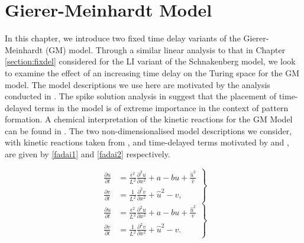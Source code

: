 \chapter{Gierer-Meinhardt Model}

In this chapter, we introduce two fixed time delay variants of the Gierer-Meinhardt (GM) model. Through a similar linear analysis to that in Chapter \ref{section:fixdel} considered for the LI variant of the Schnakenberg model, we look to examine the effect of an increasing time delay on the Turing space for the GM model. The model descriptions we use here are motivated by the analysis conducted in \cite{fadai1,fadai2}. The spike solution analysis in \cite{fadai1,fadai2} suggest that the placement of time-delayed terms in the model is of extreme importance in the context of pattern formation. A chemical interpretation of the kinetic reactions for the GM Model can be found in \cite{leegaffmonk}. The two non-dimensionalised model descriptions we consider, with kinetic reactions taken from \cite{murray}, and time-delayed terms motivated by \cite{fadai1} and \cite{fadai2}, are given by \eqref{fadai1} and \eqref{fadai2} respectively.
\begin{multicols}{2}
\begin{equation}\label{fadai1}
  \left.\begin{split}
\frac{\partial u}{\partial t}&=\frac{\epsilon^2}{L^2}\frac{\partial^2 u}{\partial x^2}+a-bu+\frac{\hat{u}^2}{\hat{v}}\\
\frac{\partial v}{\partial t}&=\frac{1}{L^2}\frac{\partial^2 v}{\partial x^2}+\hat{u}^2-v,
\end{split}\right\}
\end{equation}
\break
\begin{equation}\label{fadai2}
  \left.\begin{split}
\frac{\partial u}{\partial t}&=\frac{\epsilon^2}{L^2}\frac{\partial^2 u}{\partial x^2}+a-bu+\frac{\hat{u}^2}{v}\\
\frac{\partial v}{\partial t}&=\frac{1}{L^2}\frac{\partial^2 v}{\partial x^2}+\hat{u}^2-v.
\end{split}\right\}
\end{equation}
\end{multicols}
